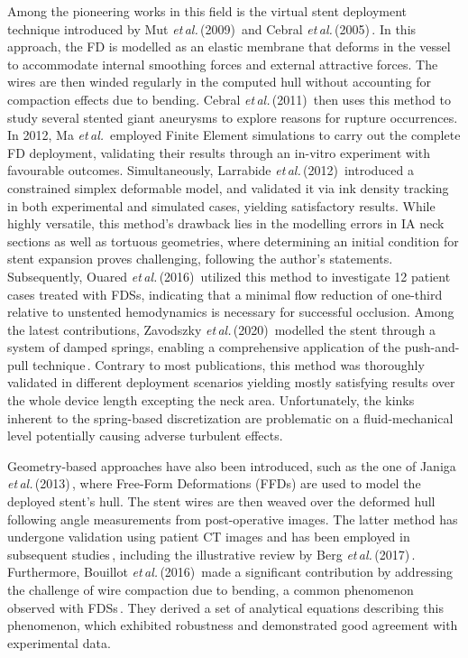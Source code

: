 Among the pioneering works in this field is the virtual stent deployment technique introduced by Mut \textit{et\,al.}\,(2009)\,\cite{Mut2009} and Cebral \textit{et\,al.}\,(2005)\,\cite{Cebral2005}. In this approach, the FD is modelled as an elastic membrane that deforms in the vessel to accommodate internal smoothing forces and external attractive forces. The wires are then winded regularly in the computed hull without accounting for compaction effects due to bending. Cebral \textit{et\,al.}\,(2011)\,\cite{Cebral2011} then uses this method to study several stented giant aneurysms to explore reasons for rupture occurrences. In 2012, Ma \textit{et\,al.}\,\cite{Ma2012} employed Finite Element simulations to carry out the complete FD deployment, validating their results through an in-vitro experiment with favourable outcomes. Simultaneously, Larrabide \textit{et\,al.}\,(2012)\,\cite{Larrabide2012} introduced a constrained simplex deformable model, and validated it via ink density tracking in both experimental and simulated cases, yielding satisfactory results. While highly versatile, this method's drawback lies in the modelling errors in IA neck sections as well as tortuous geometries, where determining an initial condition for stent expansion proves challenging, following the author's statements. Subsequently, Ouared \textit{et\,al.}\,(2016)\,\cite{Ouared2016} utilized this method to investigate 12 patient cases treated with FDSs, indicating that a minimal flow reduction of one-third relative to unstented hemodynamics is necessary for successful occlusion. Among the latest contributions, Zavodszky \textit{et\,al.}\,(2020)\,\cite{Zavodszky2020} modelled the stent through a system of damped springs, enabling a comprehensive application of the push-and-pull technique\,\cite{Shapiro2014a}. Contrary to most publications, this method was thoroughly validated in different deployment scenarios yielding mostly satisfying results over the whole device length excepting the neck area. Unfortunately, the kinks inherent to the spring-based discretization are problematic on a fluid-mechanical level potentially causing adverse turbulent effects.

Geometry-based approaches have also been introduced, such as the one of Janiga \textit{et\,al.}\,(2013)\,\cite{Janiga2013}, where Free-Form Deformations (FFDs) are used to model the deployed stent's hull. The stent wires are then weaved over the deformed hull following angle measurements from post-operative images. The latter method has undergone validation using patient CT images and has been employed in subsequent studies\,\cite{Berg2016, Sindeev2018}, including the illustrative review by Berg \textit{et\,al.}\,(2017)\,\cite{Berg2017}. Furthermore, Bouillot \textit{et\,al.}\,(2016)\,\cite{Bouillot2016} made a significant contribution by addressing the challenge of wire compaction due to bending, a common phenomenon observed with FDSs\,\cite{Shapiro2014a}. They derived a set of analytical equations describing this phenomenon, which exhibited robustness and demonstrated good agreement with experimental data.


